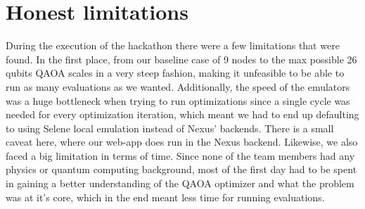 \documentclass[10pt]{article}
\begin{document}
\section{Honest limitations}
During the execution of the hackathon there were a few limitations that were found. In the first place, from our baseline case of 9 nodes to the max possible 26 qubits QAOA scales in a very steep fashion, making it unfeasible to be able to run as many evaluations as we wanted. Additionally, the speed of the emulators was a huge bottleneck when trying to run optimizations since a single cycle was needed for every optimization iteration, which meant we had to end up defaulting to using Selene local emulation instead of Nexus' backends. There is a small caveat here, where our web-app does run in the Nexus backend. Likewise, we also faced a big limitation in terms of time. Since none of the team members had any physics or quantum computing background, most of the first day had to be spent in gaining a better understanding of the QAOA optimizer and what the problem was at it's core, which in the end meant less time for running evaluations.
\end{document}
